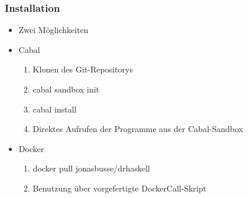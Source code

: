 \begin{frame}
	\frametitle{Installation}
	\begin{itemize}
		\item{Zwei Möglichkeiten} \pause
		\item{Cabal}
			\begin{enumerate}
				\item{Klonen des Git-Repositorys}
				\item{cabal sandbox init}
				\item{cabal install}
				\item{Direktes Aufrufen der Programme aus der Cabal-Sandbox}
			\end{enumerate}
			\pause
		\item{Docker}
			\begin{enumerate}
				\item{docker pull jonasbusse/drhaskell}
				\item{Benutzung über vorgefertigte DockerCall-Skript}
			\end{enumerate}
	\end{itemize}
\end{frame}